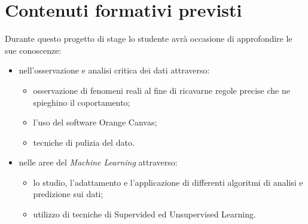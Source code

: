 \section{Contenuti formativi previsti}
Durante questo progetto di stage lo studente avrà occasione di approfondire le sue conoscenze:
\begin{itemize}
\item nell'osservazione e analisi critica dei dati attraverso:
	\begin{itemize}
	\item osservazione di fenomeni reali al fine di ricavarne regole precise che ne spieghino il coportamento;
	\item l'uso del software Orange Canvas;
	\item tecniche di pulizia del dato.
	\end{itemize}
\item nelle aree del \textit{Machine Learning}		attraverso:
	\begin{itemize}
	\item lo studio, l'adattamento e l'applicazione di differenti algoritmi di analisi e predizione sui dati;
	\item utilizzo di tecniche di Supervided ed Unsupervised Learning.
	\end{itemize}
\end{itemize} 





 









